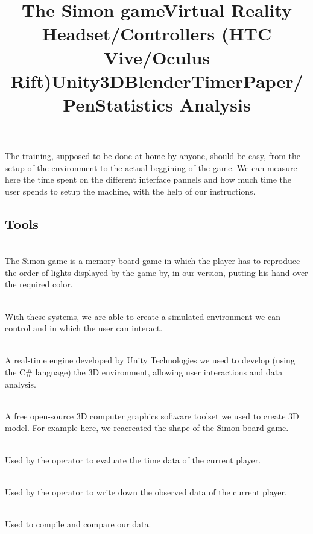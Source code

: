 \documentclass[12pt, openany, twocolumn]{article}
\begin{document}
    The training, supposed to be done at home by anyone, should be easy, from the setup of the environment to the actual beggining of the game. 
    We can measure here the time spent on the different interface pannels and how much time the user spends to setup the machine, with the help of our instructions.

    \subsection{Tools}
        \title{\textbf{The Simon game}} \\
    The Simon game is a memory board game in which the player has to reproduce the order of lights displayed by the game by, in our version, putting his hand over the required color. \\

        \noindent \title{\textbf{Virtual Reality Headset/Controllers (HTC Vive/Oculus Rift)}} \\
    With these systems, we are able to create a simulated environment we can control and in which the user can interact. \\
    
        \noindent \title{\textbf{Unity3D}} \\
    A real-time engine developed by Unity Technologies we used to develop (using the C\# language) the 3D environment, allowing user interactions and data analysis. \\

        \noindent \title{\textbf{Blender}} \\
    A free open-source 3D computer graphics software toolset we used to create 3D model. For example here, we reacreated the shape of the Simon board game. \\   
        
        \noindent \title{\textbf{Timer}} \\
    Used by the operator to evaluate the time data of the current player. \\

        \noindent \title{\textbf{Paper/Pen}} \\
    Used by the operator to write down the observed data of the current player. \\
    
        \noindent \title{\textbf{Statistics Analysis}} \\
    Used to compile and compare our data.



\end{document}
